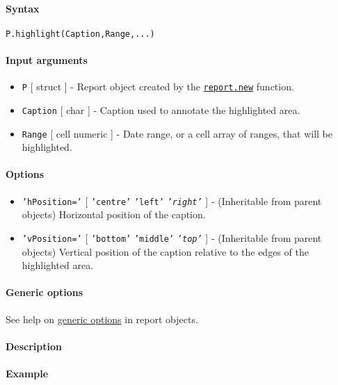 


	\paragraph{Syntax}\label{syntax}

\begin{verbatim}
P.highlight(Caption,Range,...)
\end{verbatim}

\paragraph{Input arguments}\label{input-arguments}

\begin{itemize}
\item
  \texttt{P} {[} struct {]} - Report object created by the
  \href{report/new}{\texttt{report.new}} function.
\item
  \texttt{Caption} {[} char {]} - Caption used to annotate the
  highlighted area.
\item
  \texttt{Range} {[} cell \textbar{} numeric {]} - Date range, or a cell
  array of ranges, that will be highlighted.
\end{itemize}

\paragraph{Options}\label{options}

\begin{itemize}
\item
  \texttt{'hPosition='} {[} \texttt{'centre'} \textbar{} \texttt{'left'}
  \textbar{} \emph{\texttt{'right'}} {]} - (Inheritable from parent
  objects) Horizontal position of the caption.
\item
  \texttt{'vPosition='} {[} \texttt{'bottom'} \textbar{}
  \texttt{'middle'} \textbar{} \emph{\texttt{'top'}} {]} - (Inheritable
  from parent objects) Vertical position of the caption relative to the
  edges of the highlighted area.
\end{itemize}

\paragraph{Generic options}\label{generic-options}

See help on \href{report/Contents}{generic options} in report objects.

\paragraph{Description}\label{description}

\paragraph{Example}\label{example}


